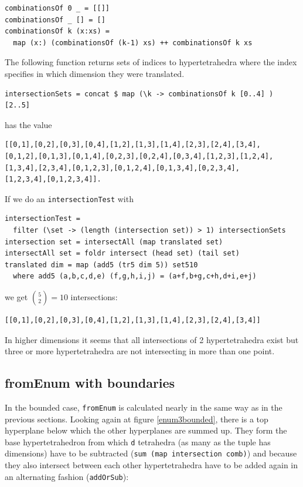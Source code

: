 \documentclass{tmr}
\begin{document}
\begin{Verbatim}
combinationsOf 0 _ = [[]]
combinationsOf _ [] = []
combinationsOf k (x:xs) =
  map (x:) (combinationsOf (k-1) xs) ++ combinationsOf k xs
\end{Verbatim}

The following function returns sets of indices to hypertetrahedra where the index specifies in which dimension they were translated.

\begin{Verbatim}
intersectionSets = concat $ map (\k -> combinationsOf k [0..4] ) [2..5]
\end{Verbatim}

has the value

\begin{Verbatim}
[[0,1],[0,2],[0,3],[0,4],[1,2],[1,3],[1,4],[2,3],[2,4],[3,4],
[0,1,2],[0,1,3],[0,1,4],[0,2,3],[0,2,4],[0,3,4],[1,2,3],[1,2,4],
[1,3,4],[2,3,4],[0,1,2,3],[0,1,2,4],[0,1,3,4],[0,2,3,4],
[1,2,3,4],[0,1,2,3,4]].
\end{Verbatim}

If we do an \verb|intersectionTest| with
\begin{Verbatim}
intersectionTest =
  filter (\set -> (length (intersection set)) > 1) intersectionSets
intersection set = intersectAll (map translated set)
intersectAll set = foldr intersect (head set) (tail set)
translated dim = map (add5 (tr5 dim 5)) set510
  where add5 (a,b,c,d,e) (f,g,h,i,j) = (a+f,b+g,c+h,d+i,e+j)
\end{Verbatim}
we get $\binom{5}{2} = 10$ intersections:

\begin{Verbatim}
[[0,1],[0,2],[0,3],[0,4],[1,2],[1,3],[1,4],[2,3],[2,4],[3,4]]
\end{Verbatim}

In higher dimensions it seems that all intersections of 2 hypertetrahedra exist but 
three or more hypertetrahedra are not intersecting in more than one point.

\subsection{fromEnum with boundaries}
In the bounded case, \verb|fromEnum| is calculated nearly in the same way as in the 
previous sections. Looking again at figure \ref{enum3bounded}, there is a top hyperplane 
below which the other hyperplanes are summed up. They form the base hypertetrahedron 
from which \verb|d| tetrahedra (as many as the tuple has dimensions) have to be subtracted 
(\verb|sum (map intersection comb)|) and because they also intersect between each other 
hypertetrahedra have to be added again in an alternating fashion (\verb|addOrSub|):
\end{document}
